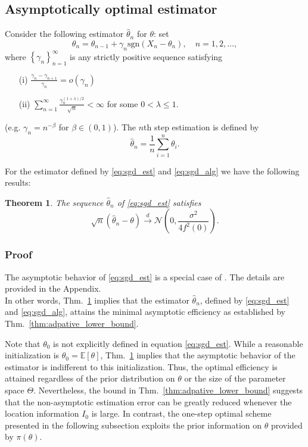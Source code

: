 \documentclass[letterpaper, conference]{IEEEtran}      %
\newtheorem{thm}{\bf{Theorem}}
\newcommand{\sgn}{\mathrm{sgn} }
\begin{document}
\subsection{Asymptotically optimal estimator}
Consider the following estimator $\widehat{\theta}_n$ for $\theta$:  set 
\begin{equation}
\label{eq:sgd_alg}
\theta_n = \theta_{n-1} +  \gamma_n \sgn (X_n - \theta_n), \quad n = 1,2,\ldots,
\end{equation}
where $\left\{\gamma_n \right\}_{n=1}^\infty$ is any strictly positive sequence satisfying 
\begin{enumerate}
\item[(i)] $\frac{\gamma_n - \gamma_{n+1}}{\gamma_n} = o(\gamma_n)$ \\
\item[(ii)] $\sum_{n=1}^\infty \frac{\gamma_n^{(1+\lambda)/2}} {\sqrt{n}} < \infty$ 
for some $0< \lambda \leq 1$.
\end{enumerate}
(e.g. $\gamma_n = n^{-\beta}$ for $\beta \in (0,1)$). The $n$th step estimation is defined by 
\begin{equation} \label{eq:sgd_est}
\widehat{\theta}_n =  \frac{1}{n} \sum_{i=1}^n  \theta_i. 
\end{equation}

For the estimator defined by \eqref{eq:sgd_est} and \eqref{eq:sgd_alg} 
we have the following results:
\begin{thm} \label{thm:sgd}
The sequence $\widehat{\theta}_n$ of \eqref{eq:sgd_est} satisfies
\[
\sqrt{n} \left( \widehat{\theta}_n - \theta \right) \overset{d}{\rightarrow} \mathcal N \left(0,  \frac{\sigma^2}{4f^2(0)}  \right).
\]
\end{thm}

\subsubsection*{Proof}
The asymptotic behavior of \eqref{eq:sgd_est} is a special case of  \cite[Thm. 4]{polyak1992acceleration}. The details are provided in the Appendix.\\

In other words, Thm.~\ref{thm:sgd} implies that the estimator $\widehat{\theta}_n$, defined by \eqref{eq:sgd_est} and \eqref{eq:sgd_alg}, attains the minimal asymptotic efficiency as established by Thm.~\ref{thm:adpative_lower_bound}.\par
Note that $\theta_0$ is not explicitly defined 
in equation \eqref{eq:sgd_est}. While a reasonable initialization is $\theta_0 = \mathbb E [\theta]$,  Thm.~\ref{thm:sgd} implies that the asymptotic behavior of the estimator is indifferent to this initialization. Thus, the optimal efficiency is attained regardless of the prior distribution on $\theta$ or the size of the parameter space $\Theta$. Nevertheless, the bound in Thm.~\ref{thm:adpative_lower_bound} suggests that the non-asymptotic estimation error can be greatly reduced whenever the location information $I_0$ is large. In contrast, the one-step optimal scheme presented in the following subsection exploits the prior information on $\theta$ provided by $\pi(\theta)$.
\end{document}
